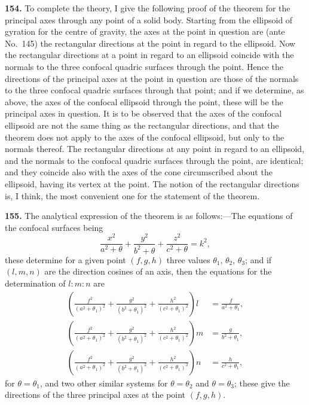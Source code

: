 \documentclass[11pt,a4paper]{book}
\begin{document}
\textbf{154.} To complete the theory, I give the following proof of the theorem for the principal axes through any point of a solid body. Starting from the ellipsoid of gyration for the centre of gravity, the axes at the point in question are (ante No.~145) the rectangular directions at the point in regard to the ellipsoid. Now the rectangular directions at a point in regard to an ellipsoid coincide with the normals to the three confocal quadric surfaces through the point. Hence the directions of the principal axes at the point in question are those of the normals to the three confocal quadric surfaces through that point; and if we determine, as above, the axes of the confocal ellipsoid through the point, these will be the principal axes in question. It is to be observed that the axes of the confocal ellipsoid are not the same thing as the rectangular directions, and that the theorem does not apply to the axes of the confocal ellipsoid, but only to the normals thereof. The rectangular directions at any point in regard to an ellipsoid, and the normals to the confocal quadric surfaces through the point, are identical; and they coincide also with the axes of the cone circumscribed about the ellipsoid, having its vertex at the point. The notion of the rectangular directions is, I think, the most convenient one for the statement of the theorem.

\textbf{155.} The analytical expression of the theorem is as follows:---The equations of the confocal surfaces being
\[
\frac{x^2}{a^2 + \theta} + \frac{y^2}{b^2 + \theta} + \frac{z^2}{c^2 + \theta} = k^2,
\]
these determine for a given point $(f, g, h)$ three values $\theta_1$, $\theta_2$, $\theta_3$; and if $(l, m, n)$ are the direction cosines of an axis, then the equations for the determination of $l : m : n$ are
\begin{align*}
\left(\frac{f^2}{(a^2 + \theta_1)^2} + \frac{g^2}{(b^2 + \theta_1)^2} + \frac{h^2}{(c^2 + \theta_1)^2}\right) l &= \frac{f}{a^2 + \theta_1}, \\
\left(\frac{f^2}{(a^2 + \theta_1)^2} + \frac{g^2}{(b^2 + \theta_1)^2} + \frac{h^2}{(c^2 + \theta_1)^2}\right) m &= \frac{g}{b^2 + \theta_1}, \\
\left(\frac{f^2}{(a^2 + \theta_1)^2} + \frac{g^2}{(b^2 + \theta_1)^2} + \frac{h^2}{(c^2 + \theta_1)^2}\right) n &= \frac{h}{c^2 + \theta_1},
\end{align*}
for $\theta = \theta_1$, and two other similar systems for $\theta = \theta_2$ and $\theta = \theta_3$; these give the directions of the three principal axes at the point $(f, g, h)$.
\end{document}
